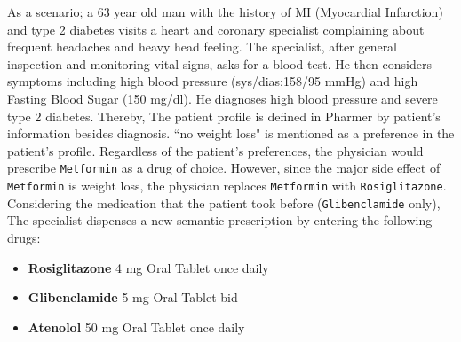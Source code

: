 \documentclass[conference]{IEEEtran}
\begin{document}
As a scenario; a 63 year old man with the history of MI (Myocardial Infarction) and type 2 diabetes visits a heart and coronary specialist complaining about frequent headaches and heavy head feeling. The specialist, after general inspection and monitoring vital signs, asks for a blood test.
He then considers symptoms including high blood pressure (sys/dias:158/95 mmHg) and high Fasting Blood Sugar (150 mg/dl).
He diagnoses high blood pressure and severe type 2 diabetes.
Thereby, The patient profile is defined in Pharmer by patient's information besides diagnosis.
``no weight loss" is mentioned as a preference in the patient's profile.
Regardless of the patient's preferences, the physician would prescribe \texttt{Metformin} as a drug of choice.
However, since the major side effect of \texttt{Metformin} is weight loss, the physician replaces \texttt{Metformin} with \texttt{Rosiglitazone}.
Considering the medication that the patient took before (\texttt{Glibenclamide} only), The specialist dispenses a new semantic prescription by entering the following drugs:

\begin{itemize}
\item \textbf{Rosiglitazone} 4 mg Oral Tablet once daily
\item \textbf{Glibenclamide} 5 mg Oral Tablet bid
\item \textbf{Atenolol} 50 mg Oral Tablet once daily
\end{itemize}
\end{document}
